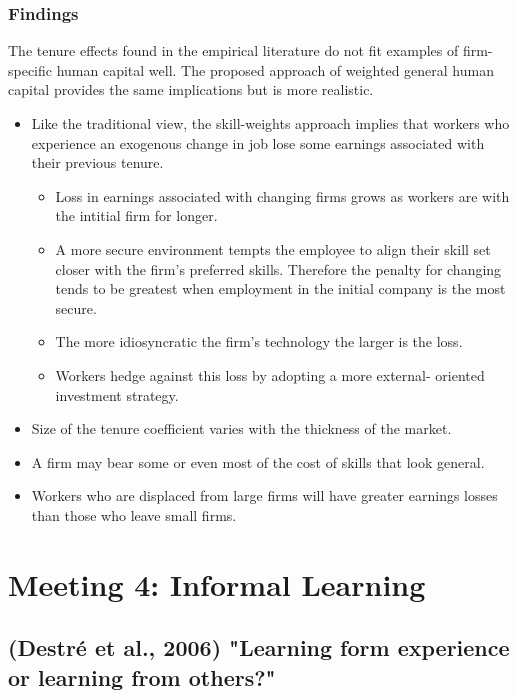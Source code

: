 \documentclass[12pt,a4paper]{article}
\begin{document}
  \subsubsection{Findings}

    The tenure effects found in the empirical literature do not fit examples of firm-specific human capital well. The proposed approach of weighted general human capital provides the same implications but is more realistic.
    \begin{itemize}
      \item Like the traditional view, the skill-weights approach implies that workers who experience an exogenous change in job lose some earnings associated with their previous tenure.
        \begin{itemize}
          \item Loss in earnings associated with changing firms grows as workers are with the intitial firm for longer.
          \item A more secure environment tempts the employee to align their skill set closer with the firm's preferred skills. Therefore the penalty for changing tends to be greatest when employment in the initial company is the most secure.
          \item The more idiosyncratic the firm's technology the larger is the loss.
          \item Workers hedge against this loss by adopting a more external- oriented investment strategy.
        \end{itemize}
      \item Size of the tenure coefficient varies with the thickness of the market.
      \item A firm may bear some or even most of the cost of skills that look general.
      \item Workers who are displaced from large firms will have greater earnings losses than those who leave small firms.
    \end{itemize}

  \section{Meeting 4: Informal Learning} %
  \label{prt:Meeting 4}
  \subsection{(Destré et al., 2006) "Learning form experience or learning from others?"} %
  \label{sec:Destre2006}
  \setcounter{equation}{0}
\end{document}
